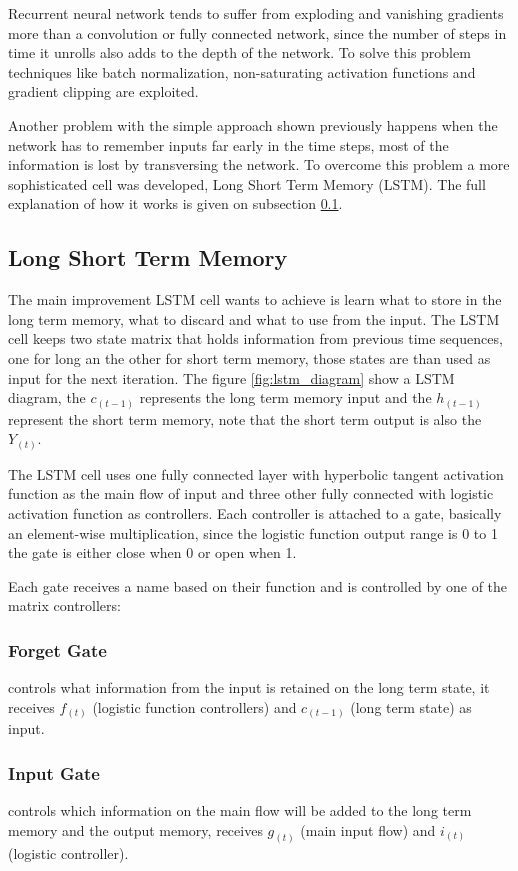 Recurrent neural network tends to suffer from exploding and vanishing gradients more than a convolution or fully connected network,
since the number of steps in time it unrolls also adds to the depth of the network.
To solve this problem techniques like batch normalization, non-saturating activation functions and gradient clipping are exploited.

Another problem with the simple approach shown previously happens when the network has to remember inputs far early in the time steps,
most of the information is lost by transversing the network.
To overcome this problem a more sophisticated cell was developed, Long Short Term Memory (LSTM).
The full explanation of how it works is given on subsection \ref{sec:lstm}.
 
\subsection{Long Short Term Memory}
\label{sec:lstm}

The main improvement LSTM cell wants to achieve is learn what to store in the long term memory, what to discard and what to use from the input.
The LSTM cell keeps two state matrix that holds information from previous time sequences,
one for long an the other for short term memory,
those states are than used as input for the next iteration.
The figure \ref{fig:lstm_diagram} show a LSTM diagram, the $c_{(t-1)}$ represents the long term memory input
and the $h_{(t-1)}$ represent the short term memory, note that the short term output is also the $Y_{(t)}$.

The LSTM cell uses one fully connected layer with hyperbolic tangent activation function as the main flow of input
and three other fully connected with logistic activation function as controllers.
Each controller is attached to a gate, basically an element-wise multiplication,
since the logistic function output range is 0 to 1 the gate is either close when 0 or open when 1.

Each gate receives a name based on their function and is controlled by one of the matrix controllers:
\subsubsection{Forget Gate} controls what information from the input is retained on the long term state,
it receives $f_{(t)}$ (logistic function controllers) and $c_{(t-1)}$ (long term state) as input.
\subsubsection{Input Gate} controls which information on the main flow will be added to the long term memory and the output memory,
receives $g_{(t)}$ (main input flow) and $i_{(t)}$ (logistic controller).
